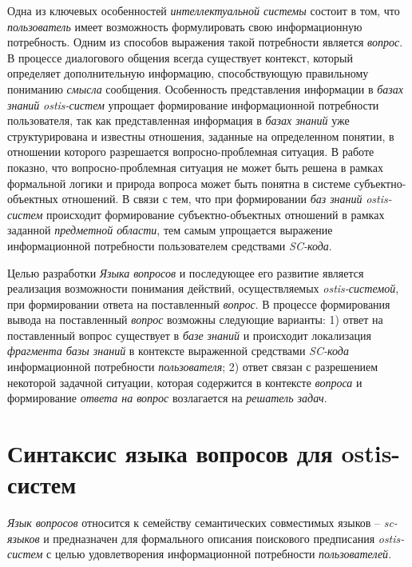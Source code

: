 Одна из ключевых особенностей \textit{интеллектуальной системы} состоит в том, что \textit{пользователь} имеет возможность формулировать свою информационную потребность. Одним из способов выражения такой потребности является \textit{вопрос}. В процессе диалогового общения всегда существует контекст, который определяет дополнительную информацию, способствующую правильному пониманию \textit{смысла} сообщения. Особенность представления информации в \textit{базах знаний} \textit{ostis-систем} упрощает формирование информационной потребности пользователя, так как представленная информация в \textit{базах знаний} уже структурирована и известны отношения, заданные на определенном понятии, в отношении которого разрешается вопросно-проблемная ситуация. В работе  показно, что вопросно-проблемная ситуация не может быть решена в рамках формальной логики и природа вопроса может быть понятна в системе субъектно-объектных отношений. В связи с тем, что при формировании \textit{баз знаний} \textit{ostis-систем} происходит формирование субъектно-объектных отношений в рамках заданной \textit{предметной области}, тем самым упрощается выражение информационной потребности пользователем средствами \textit{SC-кода}.   

Целью разработки \textit{Языка вопросов} и последующее его развитие является реализация возможности понимания действий, осуществляемых \textit{ostis-системой}, при формировании ответа на поставленный \textit{вопрос}. В процессе формирования вывода на поставленный \textit{вопрос} возможны следующие варианты:
1) ответ на поставленный вопрос существует в \textit{базе знаний} и происходит локализация \textit{фрагмента базы знаний} в контексте выраженной средствами \textit{SC-кода} информационной потребности \textit{пользователя};
2) ответ связан с разрешением некоторой задачной ситуации, которая содержится в контексте \textit{вопроса} и формирование \textit{ответа на вопрос} возлагается на \textit{решатель задач}.

\section{Синтаксис языка вопросов для ostis-систем}
\label{sec_requests_syntax}

\textit{Язык вопросов} относится к семейству семантических совместимых языков – \textit{sc-языков} и предназначен для формального описания поискового предписания \textit{ostis-систем} с целью удовлетворения информационной потребности \textit{пользователей}.


